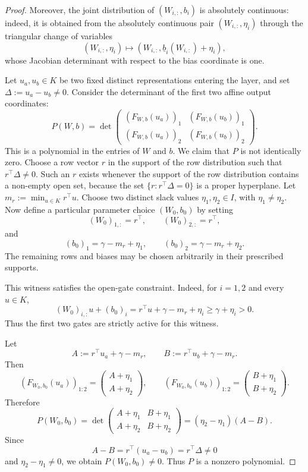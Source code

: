 \begin{proof}
Moreover, the joint distribution of $(W_{i,:},b_i)$ is absolutely continuous:
indeed, it is obtained from the absolutely continuous pair
$(W_{i,:},\eta_i)$ through the triangular change of variables
\[
(W_{i,:},\eta_i)
\mapsto
\left(W_{i,:},
\underline b_i(W_{i,:})+\eta_i\right),
\]
whose Jacobian determinant with respect to the bias coordinate is one.

Let $u_a,u_b\in K$ be two fixed distinct representations entering the layer,
and set $\Delta:=u_a-u_b\neq 0$. Consider the determinant of the first two affine output coordinates:
\[
P(W,b)
=
\det
\begin{pmatrix}
(F_{W,b}(u_a))_1 & (F_{W,b}(u_b))_1\\
(F_{W,b}(u_a))_2 & (F_{W,b}(u_b))_2
\end{pmatrix}.
\]
This is a polynomial in the entries of $W$ and $b$.
We claim that $P$ is not identically zero. Choose a row vector $r$ in the
support of the row distribution such that $r^\top\Delta\neq 0$. Such an $r$ exists whenever the support of the row distribution contains a non-empty open set, because the set $\{r:r^\top\Delta=0\}$ is a proper hyperplane.
Let $m_r:=\min_{u\in K} r^\top u$. Choose two distinct slack values $\eta_1,\eta_2\in I$, with $\eta_1\neq \eta_2$.
Now define a particular parameter choice $(W_0,b_0)$ by setting
\[
(W_0)_{1,:}=r^\top,
\qquad
(W_0)_{2,:}=r^\top,
\]
and
\[
(b_0)_1=\gamma-m_r+\eta_1,
\qquad
(b_0)_2=\gamma-m_r+\eta_2.
\]
The remaining rows and biases may be chosen arbitrarily in their prescribed
supports.

This witness satisfies the open-gate constraint. Indeed, for $i=1,2$ and every
$u\in K$,
\[
(W_0)_{i,:}u+(b_0)_i
=
r^\top u+\gamma-m_r+\eta_i
\ge
\gamma+\eta_i
>0.
\]
Thus the first two gates are strictly active for this witness.

Let
\[
A:=r^\top u_a+\gamma-m_r,
\qquad
B:=r^\top u_b+\gamma-m_r.
\]
Then
\[
(F_{W_0,b_0}(u_a))_{1:2}
=
\begin{pmatrix}
A+\eta_1\\
A+\eta_2
\end{pmatrix},
\qquad
(F_{W_0,b_0}(u_b))_{1:2}
=
\begin{pmatrix}
B+\eta_1\\
B+\eta_2
\end{pmatrix}.
\]
Therefore
\[
P(W_0,b_0)
=
\det
\begin{pmatrix}
A+\eta_1 & B+\eta_1\\
A+\eta_2 & B+\eta_2
\end{pmatrix}
=
(\eta_2-\eta_1)(A-B).
\]
Since
\[
A-B
=
r^\top(u_a-u_b)
=
r^\top\Delta
\neq 0
\]
and $\eta_2-\eta_1\neq0$, we obtain $P(W_0,b_0) \neq 0$. Thus $P$ is a nonzero polynomial.


\end{proof}
